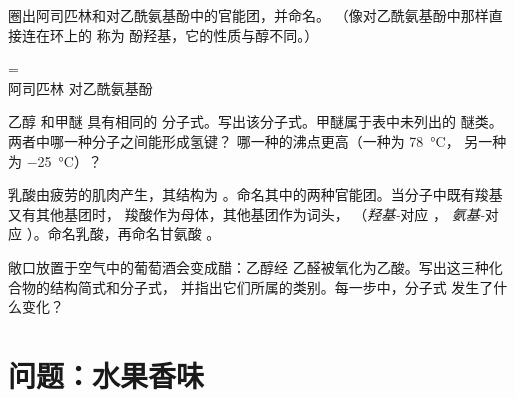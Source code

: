 \begin{exercise}[$\star\star\star$]\label{exo:g11:functional-groups:12}
圈出阿司匹林和对乙酰氨基酚中的官能团，并命名。
（像对乙酰氨基酚中那样直接连在环上的  称为
酚羟基，它的性质与醇不同。）
\begin{center}
\qquad
{}
=\\[2pt] \small 阿司匹林 \hspace{4.2cm} 对乙酰氨基酚
\end{center}
\end{exercise}

\begin{exercise}[$\star\star\star$]\label{exo:g11:functional-groups:13}
乙醇  和甲醚  具有相同的
分子式。写出该分子式。甲醚属于表中未列出的
醚类。两者中哪一种分子之间能形成氢键？
哪一种的沸点更高（一种为 \qty{78}{\celsius}，
另一种为 \qty{-25}{\celsius}）？
\end{exercise}

\begin{exercise}[$\star\star\star$]\label{exo:g11:functional-groups:14}
乳酸由疲劳的肌肉产生，其结构为
。命名其中的两种官能团。当分子中既有羧基又有其他基团时，
羧酸作为母体，其他基团作为词头，
（\emph{羟基-}对应 ，
\emph{氨基-}对应 ）。命名乳酸，再命名甘氨酸
。
\end{exercise}

\begin{exercise}[$\star\star\star$]\label{exo:g11:functional-groups:15}
敞口放置于空气中的葡萄酒会变成醋：乙醇经
乙醛被氧化为乙酸。写出这三种化合物的结构简式和分子式，
并指出它们所属的类别。每一步中，分子式
发生了什么变化？
\end{exercise}

\section{问题：水果香味}

